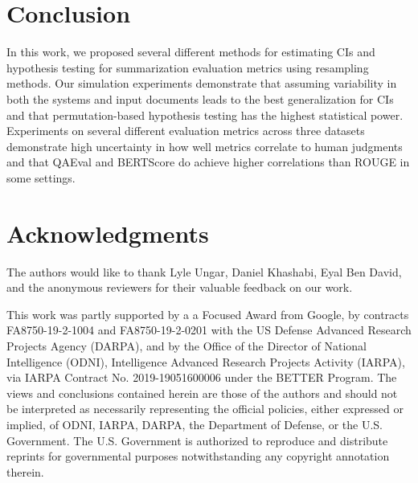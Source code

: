 \section{Conclusion}
In this work, we proposed several different methods for estimating CIs and hypothesis testing for summarization evaluation metrics using resampling methods.
Our simulation experiments demonstrate that assuming variability in both the systems and input documents leads to the best generalization for CIs and that permutation-based hypothesis testing has the highest statistical power.
Experiments on several different evaluation metrics across three datasets demonstrate high uncertainty in how well metrics correlate to human judgments and that QA\-Eval and BERTScore do achieve higher correlations than ROUGE in some settings.

\section*{Acknowledgments}
The authors would like to thank Lyle Ungar, Daniel Khashabi, Eyal Ben David, and the anonymous reviewers for their valuable feedback on our work.

This work was partly supported by a a Focused Award from Google, by contracts FA8750-19-2-1004 and FA8750-19-2-0201 with the US Defense Advanced Research Projects Agency (DARPA), and by the Office of the Director of National Intelligence (ODNI), Intelligence Advanced Research Projects Activity (IARPA), via IARPA Contract No. 2019-19051600006 under the BETTER Program.
The views and conclusions contained herein are those of the authors and should not be interpreted as necessarily representing the official policies, either expressed or implied, of ODNI, IARPA, DARPA, the Department of Defense, or the U.S. Government. The U.S. Government is authorized to reproduce and distribute reprints for governmental purposes notwithstanding any copyright annotation therein.


